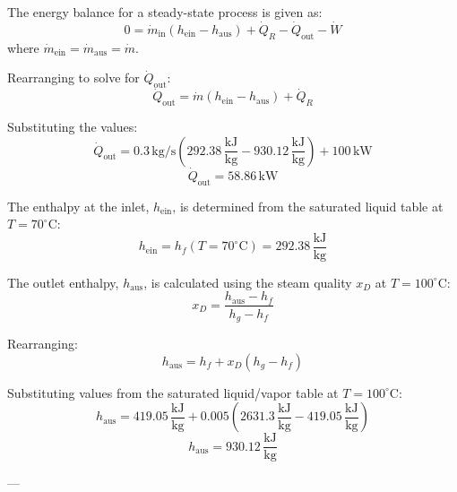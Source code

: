 The energy balance for a steady-state process is given as:  
\[
0 = \dot{m}_{\text{in}} \left( h_{\text{ein}} - h_{\text{aus}} \right) + \dot{Q}_R - \dot{Q}_{\text{out}} - \dot{W}
\]  
where \( \dot{m}_{\text{ein}} = \dot{m}_{\text{aus}} = \dot{m} \).  

Rearranging to solve for \( \dot{Q}_{\text{out}} \):  
\[
\dot{Q}_{\text{out}} = \dot{m} \left( h_{\text{ein}} - h_{\text{aus}} \right) + \dot{Q}_R
\]  

Substituting the values:  
\[
\dot{Q}_{\text{out}} = 0.3 \, \text{kg/s} \left( 292.38 \, \frac{\text{kJ}}{\text{kg}} - 930.12 \, \frac{\text{kJ}}{\text{kg}} \right) + 100 \, \text{kW}
\]  
\[
\dot{Q}_{\text{out}} = 58.86 \, \text{kW}
\]  

The enthalpy at the inlet, \( h_{\text{ein}} \), is determined from the saturated liquid table at \( T = 70^\circ\text{C} \):  
\[
h_{\text{ein}} = h_f(T = 70^\circ\text{C}) = 292.38 \, \frac{\text{kJ}}{\text{kg}}
\]  

The outlet enthalpy, \( h_{\text{aus}} \), is calculated using the steam quality \( x_D \) at \( T = 100^\circ\text{C} \):  
\[
x_D = \frac{h_{\text{aus}} - h_f}{h_g - h_f}
\]  

Rearranging:  
\[
h_{\text{aus}} = h_f + x_D \left( h_g - h_f \right)
\]  

Substituting values from the saturated liquid/vapor table at \( T = 100^\circ\text{C} \):  
\[
h_{\text{aus}} = 419.05 \, \frac{\text{kJ}}{\text{kg}} + 0.005 \left( 2631.3 \, \frac{\text{kJ}}{\text{kg}} - 419.05 \, \frac{\text{kJ}}{\text{kg}} \right)
\]  
\[
h_{\text{aus}} = 930.12 \, \frac{\text{kJ}}{\text{kg}}
\]  

---